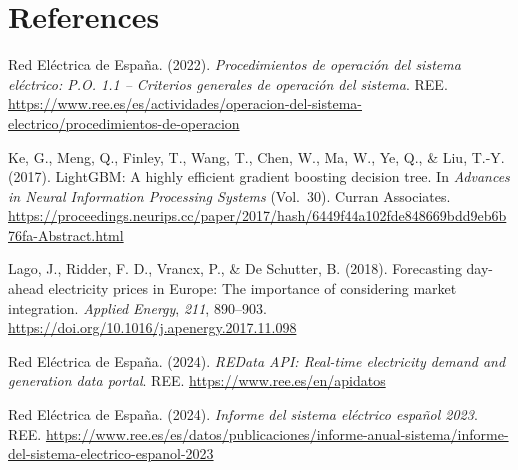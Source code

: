 \documentclass[11pt, a4paper]{article}
\begin{document}
\newpage
\section*{References}

\begingroup
{}
\small

\noindent
Red Eléctrica de España. (2022). \textit{Procedimientos de operación del
sistema eléctrico: P.O. 1.1 -- Criterios generales de operación del
sistema}. REE.
\url{https://www.ree.es/es/actividades/operacion-del-sistema-electrico/procedimientos-de-operacion}

\smallskip\noindent
Ke, G., Meng, Q., Finley, T., Wang, T., Chen, W., Ma, W., Ye, Q., \&
Liu, T.-Y. (2017). LightGBM: A highly efficient gradient boosting
decision tree. In \textit{Advances in Neural Information Processing
Systems} (Vol.~30). Curran Associates.
\url{https://proceedings.neurips.cc/paper/2017/hash/6449f44a102fde848669bdd9eb6b76fa-Abstract.html}

\smallskip\noindent
Lago, J., Ridder, F. D., Vrancx, P., \& De Schutter, B. (2018).
Forecasting day-ahead electricity prices in Europe: The importance of
considering market integration. \textit{Applied Energy}, \textit{211},
890--903. \url{https://doi.org/10.1016/j.apenergy.2017.11.098}

\smallskip\noindent
Red Eléctrica de España. (2024). \textit{REData API: Real-time
electricity demand and generation data portal}. REE.
\url{https://www.ree.es/en/apidatos}

\smallskip\noindent
Red Eléctrica de España. (2024). \textit{Informe del sistema eléctrico
español 2023}. REE.
\url{https://www.ree.es/es/datos/publicaciones/informe-anual-sistema/informe-del-sistema-electrico-espanol-2023}

\endgroup
\end{document}
